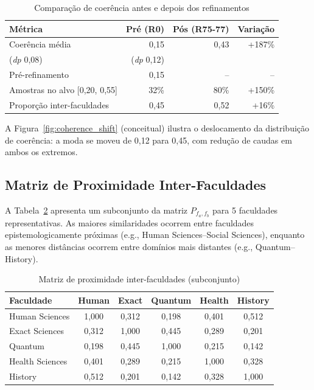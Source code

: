 \documentclass[a4paper,12pt]{article}
\begin{document}
\begin{table}[H]
\centering
\caption{Comparação de coerência antes e depois dos refinamentos}
\label{tab:coherence}
\begin{tabular}{lrrr}
\toprule
\textbf{Métrica} & \textbf{Pré (R0)} & \textbf{Pós (R75-77)} & \textbf{Variação} \\
\midrule
Coerência média & 0,15 & 0,43 & +187\% \\
   (\textit{dp} 0,08) & (\textit{dp} 0,12) & \\
Pré-refinamento & 0,15 & -- & -- \\
Amostras no alvo [0,20, 0,55] & 32\% & 80\% & +150\% \\
Proporção inter-faculdades & 0,45 & 0,52 & +16\% \\
\bottomrule
\end{tabular}
\end{table}

A Figura~\ref{fig:coherence_shift} (conceitual) ilustra o deslocamento da distribuição 
de coerência: a moda se moveu de 0,12 para 0,45, com redução de caudas em ambos os extremos.

\subsection{Matriz de Proximidade Inter-Faculdades}

A Tabela~\ref{tab:proximity} apresenta um subconjunto da matriz $P_{f_a,f_b}$ para 
5 faculdades representativas. As maiores similaridades ocorrem entre faculdades 
epistemologicamente próximas (e.g., Human Sciences--Social Sciences), enquanto 
as menores distâncias ocorrem entre domínios mais distantes (e.g., Quantum--History).

\begin{table}[H]
\centering
\caption{Matriz de proximidade inter-faculdades (subconjunto)}
\label{tab:proximity}
\begin{tabular}{lccccc}
\toprule
\textbf{Faculdade} & \textbf{Human} & \textbf{Exact} & \textbf{Quantum} & \textbf{Health} & \textbf{History} \\
\midrule
Human Sciences   & 1,000 & 0,312 & 0,198 & 0,401 & 0,512 \\
Exact Sciences   & 0,312 & 1,000 & 0,445 & 0,289 & 0,201 \\
Quantum          & 0,198 & 0,445 & 1,000 & 0,215 & 0,142 \\
Health Sciences  & 0,401 & 0,289 & 0,215 & 1,000 & 0,328 \\
History          & 0,512 & 0,201 & 0,142 & 0,328 & 1,000 \\
\bottomrule
\end{tabular}
\end{table}
\end{document}
